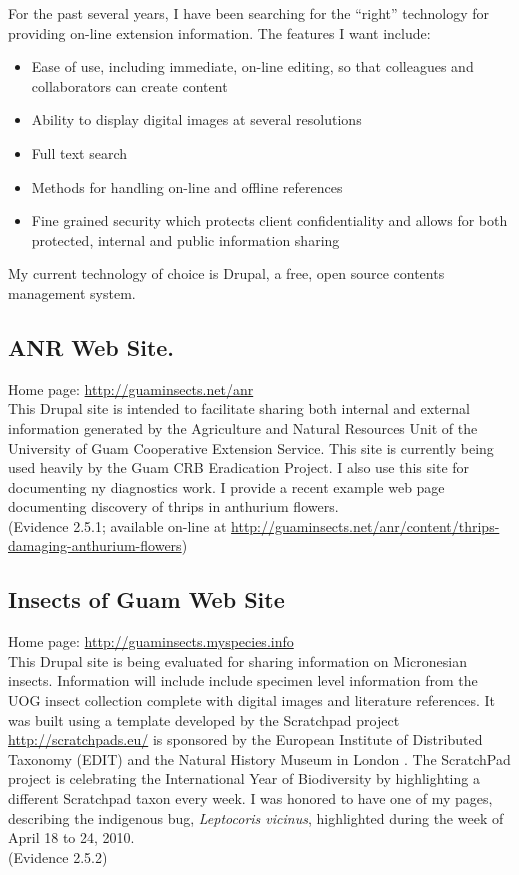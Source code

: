 \documentclass[12pt,oneside,english]{scrbook}
\begin{document}
For the past several years, I have been searching for the ``right''
technology for providing on-line extension information. The features
I want include:
\begin{itemize}
\item Ease of use, including immediate, on-line editing, so that colleagues
and collaborators can create content
\item Ability to display digital images at several resolutions
\item Full text search
\item Methods for handling on-line and offline references
\item Fine grained security which protects client confidentiality and allows
for both protected, internal and public information sharing
\end{itemize}
My current technology of choice is Drupal, a free, open source contents
management system. 

\subsection{ANR Web Site.}

Home page: \url{http://guaminsects.net/anr}\\
This Drupal site is intended to facilitate sharing both internal and
external information generated by the Agriculture and Natural Resources
Unit of the University of Guam Cooperative Extension Service. This
site is currently being used heavily by the Guam CRB Eradication Project.
I also use this site for documenting ny diagnostics work. I provide
a recent example web page documenting discovery of thrips in anthurium
flowers. \\
(Evidence 2.5.1; available on-line at \url{http://guaminsects.net/anr/content/thrips-damaging-anthurium-flowers})

\subsection{Insects of Guam Web Site}

Home page: \url{http://guaminsects.myspecies.info}\textbf{}\\
This Drupal site is being evaluated for sharing information on Micronesian
insects. Information will include include specimen level information
from the UOG insect collection complete with digital images and literature
references. It was built using a template developed by the Scratchpad
project \url{http://scratchpads.eu/} is sponsored by the European
Institute of Distributed Taxonomy (EDIT) and the Natural History Museum
in London . The ScratchPad project is celebrating the International
Year of Biodiversity by highlighting a different Scratchpad taxon
every week. I was honored to have one of my pages, describing the
indigenous bug, \textit{Leptocoris vicinus}, highlighted during the
week of April 18 to 24, 2010.\\
(Evidence 2.5.2)
\end{document}

